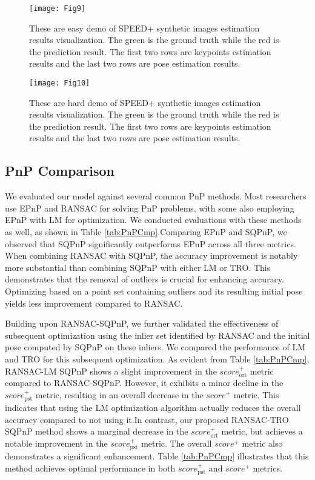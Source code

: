 \documentclass[a4paper,fleqn]{cas-sc}
\begin{document}
\begin{figure*}[!t]
	\centering
	\texttt{[image: Fig9]} 
	\caption{These are easy demo of SPEED+ synthetic images estimation results visualization. The green is the ground truth while the red is the prediction result. The first two rows are keypoints estimation results and the last two rows are pose estimation results.}
	\label{fig:easydemo}
\end{figure*}

\begin{figure*}[!t]
	\centering
	\texttt{[image: Fig10]} 
	\caption{These are hard demo of SPEED+ synthetic images estimation results visualization. The green is the ground truth while the red is the prediction result. The first two rows are keypoints estimation results and the last two rows are pose estimation results.}
	\label{fig:harddemo}
\end{figure*}

\subsection{PnP Comparison}
We evaluated our model against several common PnP methods. Most researchers use EPnP and RANSAC for solving PnP problems, with some also employing EPnP with LM for optimization. We conducted evaluations with these methods as well, as shown in Table \ref{tab:PnPCmp}.Comparing EPnP and SQPnP, we observed that SQPnP significantly outperforms EPnP across all three metrics. When combining RANSAC with SQPnP, the accuracy improvement is notably more substantial than combining SQPnP with either LM or TRO. This demonstrates that the removal of outliers is crucial for enhancing accuracy. Optimizing based on a point set containing outliers and its resulting initial pose yields less improvement compared to RANSAC.

Building upon RANSAC-SQPnP, we further validated the effectiveness of subsequent optimization using the inlier set identified by RANSAC and the initial pose computed by SQPnP on these inliers. We compared the performance of LM and TRO for this subsequent optimization. As evident from Table \ref{tab:PnPCmp}, RANSAC-LM SQPnP shows a slight improvement in the $score_{\text{ort}}^+$ metric compared to RANSAC-SQPnP. However, it exhibits a minor decline in the $score_{\text{pst}}^+$ metric, resulting in an overall decrease in the $score^+$ metric. This indicates that using the LM optimization algorithm actually reduces the overall accuracy compared to not using it.In contrast, our proposed RANSAC-TRO SQPnP method shows a marginal decrease in the $score_{\text{ort}}^+$ metric, but achieves a notable improvement in the $score_{\text{pst}}^+$ metric. The overall $score^+$ metric also demonstrates a significant enhancement. Table \ref{tab:PnPCmp} illustrates that this method achieves optimal performance in both $score_{\text{pst}}^+$ and $score^+$ metrics.
\end{document}
